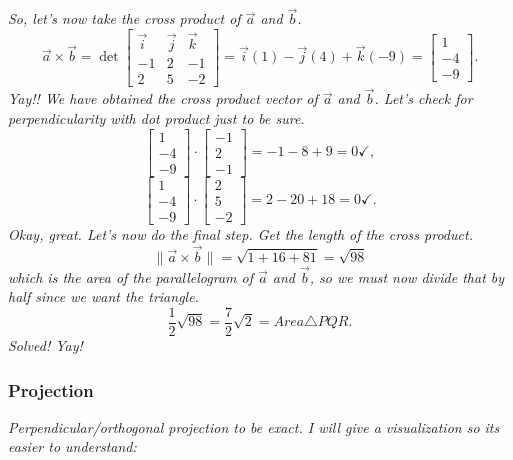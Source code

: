 \documentclass[addpoints]{exam}
\begin{document}
\textit{
So, let's now take the cross product of $\vec{a}$ and $\vec{b}$.
\[
\vec{a}
\times\vec{b} = 
\det\begin{bmatrix}
    \vec{i}&\vec{j}&\vec{k}\\
    -1&2&-1\\
    2&5&-2
\end{bmatrix}=
\vec{i}(1)-\vec{j}(4)+\vec{k}(-9)=\begin{bmatrix}
    1\\-4\\-9
\end{bmatrix}.
\] Yay!! We have obtained the cross product vector of $\vec{a}$ and $\vec{b}$. Let's check for perpendicularity with dot product just to be sure.
\[
\begin{bmatrix}
    1\\-4\\-9   
\end{bmatrix}\cdot\begin{bmatrix}
    -1\\2\\-1
\end{bmatrix}=-1-8+9=0\checkmark,
\]
\[
\begin{bmatrix}
    1\\-4\\-9   
\end{bmatrix}\cdot\begin{bmatrix}
    2\\5\\-2
\end{bmatrix}=2-20+18=0\checkmark.
\]
Okay, great. Let's now do the final step. Get the length of the cross product.
\[
\|\vec{a}\times\vec{b}\|=\sqrt{1+16+81}=\sqrt{98}
\]
which is the area of the parallelogram of $\vec{a}$ and $\vec{b}$, so we must now divide that by half since we want the triangle.\[
\frac12\sqrt{98}=\frac{7}{2}\sqrt{2}=Area\triangle PQR.
\] Solved! Yay!
}
\pagebreak\subsubsection{
Projection 
}
\textit{
Perpendicular/orthogonal projection to be exact. I will give a visualization so its easier to understand:
}
\end{document}
